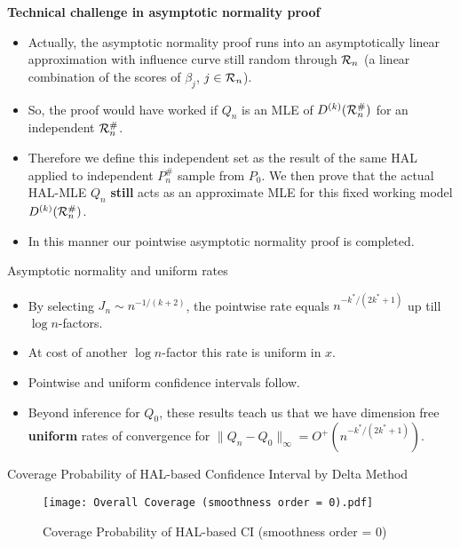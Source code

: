 \documentclass[t]{beamer}
\newlength{\wideitemsep}
\let\olditem\item
\renewcommand{\item}{\setlength{\itemsep}{\wideitemsep}\olditem}
\newcommand{\pl}{\parallel}
\begin{document}
 \begin{frame}{\bf Technical challenge in asymptotic normality proof}
 \begin{itemize}
  \item Actually, the asymptotic normality  proof runs into an asymptotically linear approximation with influence curve still random through ${\cal R}_n$ (a linear combination of the scores of $\beta_j$, $j\in {\cal R}_n$).
    \item So, the proof would have worked if $Q_n$ is an MLE of $D^{(k)}({\cal R}_n^{\#})$ for an independent ${\cal R}_n^{\#}$.
  \item  Therefore we define this independent set as the result of the same HAL applied to independent $P_n^{\#}$ sample from $P_0$.
  We then prove that the actual HAL-MLE $Q_n$ {\bf still} acts as an approximate MLE for this fixed working model $D^{(k)}({\cal R}_n^{\#})$.
 \item In this manner our pointwise asymptotic normality proof is completed.
 \end{itemize}
 \end{frame}
 \begin{frame}{Asymptotic normality and uniform rates}
 \begin{itemize}
\item By selecting $J_n\sim n^{-1/(k+2)}$, the pointwise rate equals $n^{-k^*/(2k^*+1)}$ up till $\log n$-factors.
\item At cost of another $\log n$-factor this rate is uniform in $x$.
\item Pointwise and uniform confidence intervals follow.
\item Beyond inference for $Q_0$, these results teach us that we have dimension free {\bf uniform} rates of convergence for $\pl Q_n-Q_0\pl_{\infty}=O^+(n^{-k^*/(2k^*+1)})$.
\end{itemize}

\end{frame}

\begin{frame}{Coverage Probability of HAL-based Confidence Interval by Delta Method}
    \begin{figure}
        \centering
        \texttt{[image: Overall Coverage (smoothness order = 0).pdf]}
        \caption{Coverage Probability of HAL-based CI (smoothness order = 0)}
        \label{fig:my_label}
    \end{figure}
\end{frame}
\end{document}
